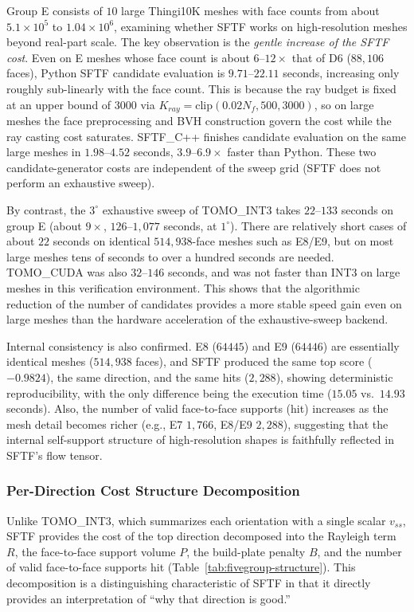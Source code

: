 \documentclass[11pt,a4paper]{article}
\begin{document}
Group E consists of $10$ large Thingi10K meshes with face counts from about $5.1\times10^5$ to $1.04\times10^6$,
examining whether SFTF works on high-resolution meshes beyond real-part scale.
The key observation is the \emph{gentle increase of the SFTF cost}.
Even on E meshes whose face count is about $6$--$12\times$ that of D6 ($88{,}106$ faces), Python SFTF candidate evaluation is $9.71$--$22.11$ seconds,
increasing only roughly sub-linearly with the face count.
This is because the ray budget is fixed at an upper bound of $3000$ via $K_{ray}=\mathrm{clip}(0.02N_f,500,3000)$,
so on large meshes the face preprocessing and BVH construction govern the cost while the ray casting cost saturates.
SFTF\_C++ finishes candidate evaluation on the same large meshes in $1.98$--$4.52$ seconds,
$3.9$--$6.9\times$ faster than Python.
These two candidate-generator costs are independent of the sweep grid (SFTF does not perform an exhaustive sweep).

By contrast, the $3^\circ$ exhaustive sweep of TOMO\_INT3 takes $22$--$133$ seconds on group E (about $9\times$, $126$--$1{,}077$ seconds, at $1^\circ$).
There are relatively short cases of about $22$ seconds on identical $514{,}938$-face meshes such as E8/E9, but
on most large meshes tens of seconds to over a hundred seconds are needed.
TOMO\_CUDA was also $32$--$146$ seconds, and was not faster than INT3 on large meshes in this verification environment.
This shows that the algorithmic reduction of the number of candidates provides a more stable speed gain even on large meshes
than the hardware acceleration of the exhaustive-sweep backend.

Internal consistency is also confirmed.
E8 ($64445$) and E9 ($64446$) are essentially identical meshes ($514{,}938$ faces),
and SFTF produced the same top score ($-0.9824$), the same direction, and the same hits ($2{,}288$),
showing deterministic reproducibility, with the only difference being the execution time ($15.05$ vs.\ $14.93$ seconds).
Also, the number of valid face-to-face supports (hit) increases as the mesh detail becomes richer
(e.g., E7 $1{,}766$, E8/E9 $2{,}288$), suggesting that the internal self-support structure of high-resolution shapes
is faithfully reflected in SFTF's flow tensor.

\subsubsection{Per-Direction Cost Structure Decomposition}

Unlike TOMO\_INT3, which summarizes each orientation with a single scalar $v_{ss}$,
SFTF provides the cost of the top direction decomposed into the Rayleigh term $R$, the face-to-face support volume $P$,
the build-plate penalty $B$, and the number of valid face-to-face supports hit
(Table~\ref{tab:fivegroup-structure}).
This decomposition is a distinguishing characteristic of SFTF in that it directly provides an interpretation of ``why that direction is good.''
\end{document}
